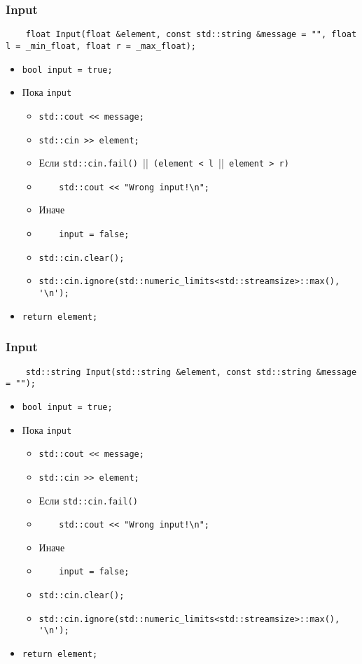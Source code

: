 \subsubsection*{Input}

\begin{lstlisting}
	float Input(float &element, const std::string &message = "", float l = _min_float, float r = _max_float);
\end{lstlisting}

\begin{itemize}
	\item \verb|bool input = true;|
	\item Пока \verb|input|
		\begin{itemize}
			\item \verb|std::cout << message;|
			\item \verb|std::cin >> element;|
			\item Если \verb|std::cin.fail() |||\verb| (element < l |||\verb| element > r)|
			\item \verb|    std::cout << "Wrong input!\n";|
			\item Иначе
			\item \verb|    input = false;|
			\item \verb|std::cin.clear();|
			\item \verb|std::cin.ignore(std::numeric_limits<std::streamsize>::max(), '\n');|
		\end{itemize}
    \item \verb|return element;|
\end{itemize}


\subsubsection*{Input}

\begin{lstlisting}
	std::string Input(std::string &element, const std::string &message = "");
\end{lstlisting}

\begin{itemize}
	\item \verb|bool input = true;|
	\item Пока \verb|input|
		\begin{itemize}
			\item \verb|std::cout << message;|
			\item \verb|std::cin >> element;|
			\item Если \verb|std::cin.fail()|
			\item \verb|    std::cout << "Wrong input!\n";|
			\item Иначе
			\item \verb|    input = false;|
			\item \verb|std::cin.clear();|
			\item \verb|std::cin.ignore(std::numeric_limits<std::streamsize>::max(), '\n');|
		\end{itemize}
    \item \verb|return element;|
\end{itemize}


